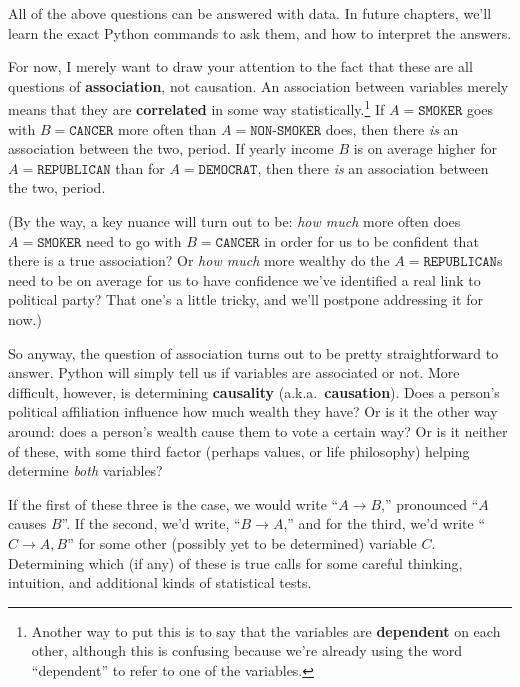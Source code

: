 All of the above questions can be answered with data. In future chapters, we'll
learn the exact Python commands to ask them, and how to interpret the answers.


For now, I merely want to draw your attention to the fact that these are all
questions of \textbf{association}, not causation. An association between
variables merely means that they are \textbf{correlated} in some way
statistically.\footnote{Another way to put this is to say that the variables
are \textbf{dependent} on each other, although this is confusing because we're
already using the word ``dependent'' to refer to one of the variables.} If
$A=\texttt{SMOKER}$ goes with $B=\texttt{CANCER}$ more often than
$A=\texttt{NON-SMOKER}$ does, then there \textit{is} an association between the
two, period. If yearly income $B$ is on average higher for
$A=\texttt{REPUBLICAN}$ than for $A=\texttt{DEMOCRAT}$, then there \textit{is}
an association between the two, period.

\label{howMuchMore}

(By the way, a key nuance will turn out to be: \textit{how much} more often
does $A=\texttt{SMOKER}$ need to go with $B=\texttt{CANCER}$ in order for us to
be confident that there is a true association? Or \textit{how much} more
wealthy do the $A=\texttt{REPUBLICAN}$s need to be on average for us to have
confidence we've identified a real link to political party? That one's a little
tricky, and we'll postpone addressing it for now.)

\label{pythonAssociation}

So anyway, the question of association turns out to be pretty straightforward
to answer. Python will simply tell us if variables are associated or not. More
difficult, however, is determining \textbf{causality}
(a.k.a.~\textbf{causation}). Does a person's political affiliation influence
how much wealth they have? Or is it the other way around: does a person's
wealth cause them to vote a certain way? Or is it neither of these, with some
third factor (perhaps values, or life philosophy) helping determine
\textit{both} variables?


If the first of these three is the case, we would write ``$A \rightarrow B$,''
pronounced ``$A$ causes $B$''. If the second, we'd write, ``$B \rightarrow
A$,'' and for the third, we'd write ``$C \rightarrow A, B$'' for some other
(possibly yet to be determined) variable $C$. Determining which (if any) of
these is true calls for some careful thinking, intuition, and additional kinds
of statistical tests.

